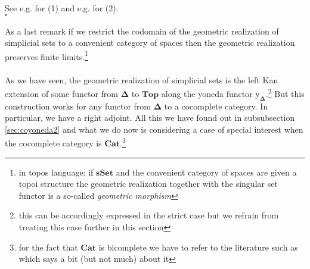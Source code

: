 \begin{prf}
See e.g. \cite{8b5861fc} for (1) and e.g. \cite{b28b8d8f} for (2).
\\
\phantom{proven}
\hfill
$\square$
\end{prf}
As a last remark if we restrict the codomain of the geometric realization of simplicial sets to a convenient category of spaces then the geometric realization preserves finite limits.\footnote{in topos language: if $\mathbf{sSet}$ and the convenient category of spaces are given a topoi structure the geometric realization together with the singular set functor is a so-called \textit{geometric morphism}}
\\\\
As we have seen, the geometric realization of simplicial sets is the left Kan extension of some functor from $\mathbf{\Delta}$ to $\mathbf{Top}$ along the yoneda functor $\mathrm{y}_{\mathbf{\Delta}}$.\footnote{this can be accordingly expressed in the strict case but we refrain from treating this case further in this section} But this construction works for any functor from $\mathbf{\Delta}$ to a cocomplete category. In particular, we have a right adjoint. All this we have found out in subsubsection \ref{sec:coyoneda2} and what we do now is considering a case of special interest when the cocomplete category is $\mathbf{Cat}$.\footnote{for the fact that $\mathbf{Cat}$ is bicomplete we have to refer to the literature such as \cite{52fbba46} which says a bit (but not much) about it}
\\
